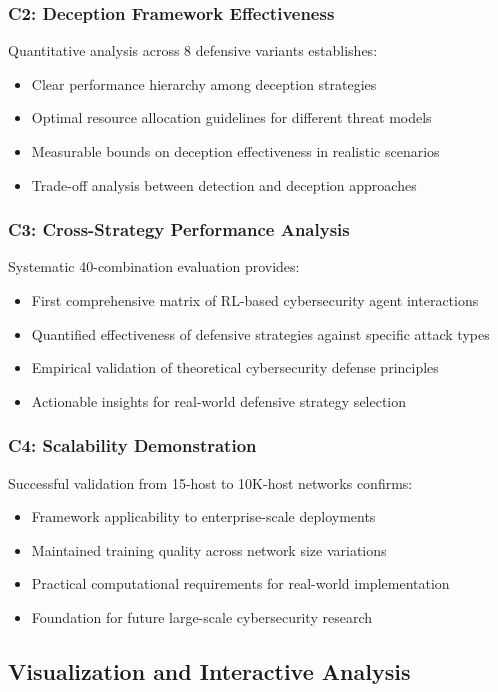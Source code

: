 \documentclass[11pt]{article}
\theoremstyle{definition}
\theoremstyle{plain}
\begin{document}
\subsubsection{C2: Deception Framework Effectiveness}
Quantitative analysis across 8 defensive variants establishes:
\begin{itemize}
\item Clear performance hierarchy among deception strategies
\item Optimal resource allocation guidelines for different threat models
\item Measurable bounds on deception effectiveness in realistic scenarios
\item Trade-off analysis between detection and deception approaches
\end{itemize}

\subsubsection{C3: Cross-Strategy Performance Analysis}
Systematic 40-combination evaluation provides:
\begin{itemize}
\item First comprehensive matrix of RL-based cybersecurity agent interactions
\item Quantified effectiveness of defensive strategies against specific attack types
\item Empirical validation of theoretical cybersecurity defense principles
\item Actionable insights for real-world defensive strategy selection
\end{itemize}

\subsubsection{C4: Scalability Demonstration}
Successful validation from 15-host to 10K-host networks confirms:
\begin{itemize}
\item Framework applicability to enterprise-scale deployments
\item Maintained training quality across network size variations
\item Practical computational requirements for real-world implementation
\item Foundation for future large-scale cybersecurity research
\end{itemize}

\subsection{Visualization and Interactive Analysis}
\end{document}

